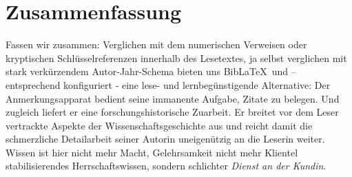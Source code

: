 \section{Zusammenfassung}

Fassen wir zusammen: Verglichen mit dem numerischen Verweisen oder kryptischen Schlüsselreferenzen innerhalb des Lesetextes, ja selbst verglichen mit stark verkürzendem Autor-Jahr-Schema bieten uns Bib\LaTeX\ und  -- entsprechend konfiguriert - eine lese- und lernbegünstigende Alternative: Der Anmerkungsapparat bedient seine immanente Aufgabe, Zitate zu belegen. Und zugleich liefert er eine forschungshistorische Zuarbeit. Er breitet vor dem Leser vertrackte Aspekte der Wissenschaftsgeschichte aus und reicht damit die schmerzliche Detailarbeit seiner Autorin uneigenützig an die Leserin weiter. Wissen ist hier nicht mehr Macht, Gelehrsamkeit nicht mehr Klientel stabilisierendes Herrschaftswissen, sondern schlichter \emph{Dienst an der Kundin}.
